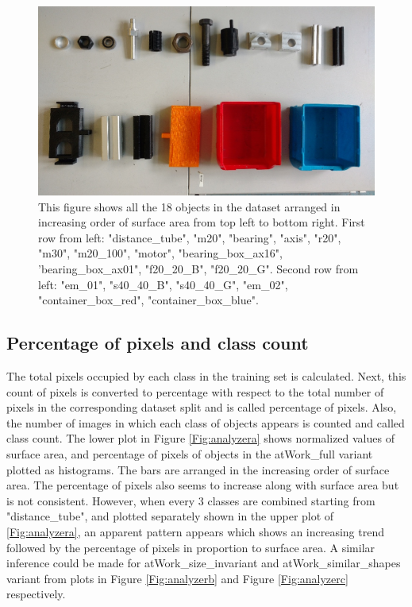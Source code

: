 		\begin{figure}[h]
		\centering
		\includegraphics[scale=0.3]{images/all_objects}
		\caption{This figure shows all the 18 objects in the dataset arranged in increasing order of surface area from top left to bottom right. First row from left: "distance\_tube", "m20", "bearing", "axis", "r20", "m30", "m20\_100", "motor", "bearing\_box\_ax16", 'bearing\_box\_ax01", "f20\_20\_B", "f20\_20\_G". Second row from left: "em\_01", "s40\_40\_B", "s40\_40\_G", "em\_02", "container\_box\_red", "container\_box\_blue".}
		\label{Fig:allobjects}
	\end{figure}
	
	\subsection{Percentage of pixels and class count}
		
		The total pixels occupied by each class in the training set is calculated. Next, this count of pixels is converted to percentage with respect to the total number of pixels in the corresponding dataset split and is called percentage of pixels. Also, the number of images in which each class of objects appears is counted and called class count. The lower plot in Figure \ref{Fig:analyzera} shows normalized values of surface area, and percentage of pixels of objects in the atWork\_full variant plotted as histograms. The bars are arranged in the increasing order of surface area. The percentage of pixels also seems to increase along with surface area but is not consistent. However, when every 3 classes are combined starting from "distance\_tube", and plotted separately shown in the upper plot of \ref{Fig:analyzera}, an apparent pattern appears which shows an increasing trend followed by the percentage of pixels in proportion to surface area. A similar inference could be made for atWork\_size\_invariant and atWork\_similar\_shapes variant from plots in Figure \ref{Fig:analyzerb} and Figure \ref{Fig:analyzerc} respectively.
		
